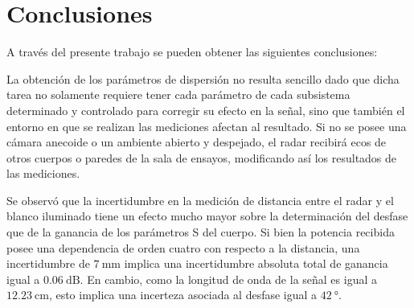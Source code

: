 \chapter{Conclusiones} \label{ch:conclusions}

\ifpdf
    \graphicspath{{Chapter6/Figs/Raster/}{Chapter6/Figs/PDF/}{Chapter6/Figs/}}
\else
    \graphicspath{{Chapter6/Figs/Vector/}{Chapter6/Figs/}}
\fi


A través del presente trabajo se pueden obtener las siguientes conclusiones:

La obtención de los parámetros de dispersión no resulta sencillo dado que dicha tarea no solamente requiere tener cada parámetro de cada subsistema determinado y controlado para corregir su efecto en la señal, sino que también el entorno en que se realizan las mediciones afectan al resultado. Si no se posee una cámara anecoide o un ambiente abierto y despejado, el radar recibirá ecos de otros cuerpos o paredes de la sala de ensayos, modificando así los resultados de las mediciones.

Se observó que la incertidumbre en la medición de distancia entre el radar y el blanco iluminado tiene un efecto mucho mayor sobre la determinación del desfase que de la ganancia de los parámetros S del cuerpo. Si bien la potencia recibida posee una dependencia de orden cuatro con respecto a la distancia, una incertidumbre de $\SI{7}{\milli\meter}$ implica una incertidumbre absoluta total de ganancia igual a $\SI{0.06}{\dB}$. En cambio, como la longitud de onda de la señal es igual a $\SI{12.23}{\centi\meter}$, esto implica una incerteza asociada al desfase igual a $\SI{42}{\degree}$.

